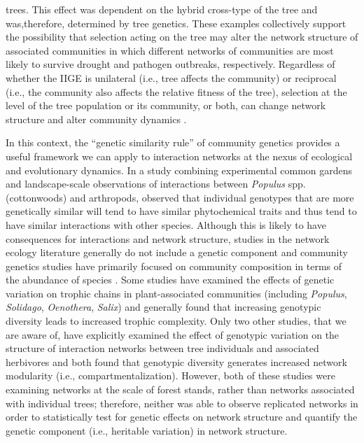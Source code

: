 \documentclass[fleqn,12pt]{olplainarticle}
\begin{document}
trees. This effect was dependent on the hybrid cross-type of the tree
and was,therefore, determined by tree genetics. These examples
collectively support the possibility that selection acting on the tree
may alter the network structure of associated communities in which
different networks of communities are most likely to survive drought
and pathogen outbreaks, respectively. Regardless of whether the IIGE
is unilateral (i.e., tree affects the community) or reciprocal (i.e.,
the community also affects the relative fitness of the tree),
selection at the level of the tree population or its community, or
both, can change network structure and alter community dynamics
\citep{Whitham2020IntraspecificEvolution}.

In this context, the ``genetic similarity rule'' of community genetics
provides a useful framework we can apply to interaction networks at
the nexus of ecological and evolutionary dynamics. In a study
combining experimental common gardens and landscape-scale observations
of interactions between \textit{Populus} spp.  (cottonwoods) and
arthropods, \cite{Bangert2006} observed that individual genotypes that
are more genetically similar will tend to have similar phytochemical
traits and thus tend to have similar interactions with other
species. Although this is likely to have consequences for interactions
and network structure, studies in the network ecology literature
generally do not include a genetic component \citep{Lau2017a} and
community genetics studies have primarily focused on community
composition in terms of the abundance of species
\citep{DesRoches2018TheVariation}. Some studies have examined the
effects of genetic variation on trophic chains in plant-associated
communities (including \textit{Populus}, \textit{Solidago},
\textit{Oenothera}, \textit{Salix})
\citep{Bailey2005ImportanceInteractions, Johnson2008, Smith2011,
  Smith2015b, Barbour2016GeneticComplexity} and generally found that
increasing genotypic diversity leads to increased trophic
complexity. Only two other studies, that we are aware of, have
explicitly examined the effect of genotypic variation on the structure
of interaction networks between tree individuals and associated
herbivores \citep{Lau2016afix, Keith2017} and both found that
genotypic diversity generates increased network modularity (i.e.,
compartmentalization).  However, both of these studies were examining
networks at the scale of forest stands, rather than networks
associated with individual trees; therefore, neither was able to
observe replicated networks in order to statistically test for genetic
effects on network structure and quantify the genetic component (i.e.,
heritable variation) in network structure.
\end{document}
